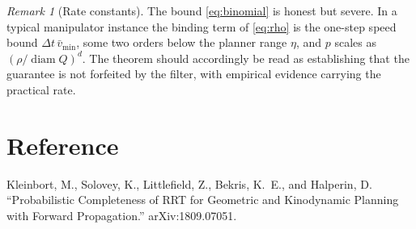 \documentclass[11pt]{article}
\theoremstyle{remark}
\newtheorem{remark}{Remark}
\begin{document}
\begin{remark}[Rate constants]
\label{rem:rate}
The bound \eqref{eq:binomial} is honest but severe. In a typical manipulator instance the
binding term of \eqref{eq:rho} is the one-step speed bound $\Delta t\,\bar v_{\min}$, some
two orders below the planner range $\eta$, and $p$ scales as $(\rho/\operatorname{diam}Q)^d$.
The theorem should accordingly be read as establishing that the guarantee is not forfeited
by the filter, with empirical evidence carrying the practical rate.
\end{remark}

\section*{Reference}

Kleinbort, M., Solovey, K., Littlefield, Z., Bekris, K.~E., and Halperin, D.
``Probabilistic Completeness of RRT for Geometric and Kinodynamic Planning with Forward
Propagation.'' arXiv:1809.07051.
\end{document}
